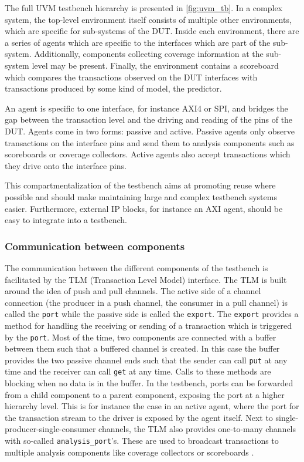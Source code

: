 \documentclass[11pt]{report}
\newcommand{\ttt}{\texttt}
\begin{document}
The full UVM testbench hierarchy is presented in \ref{fig:uvm_tb}. In a complex system, the top-level environment
itself consists of
multiple other environments, which are specific for sub-systems of the DUT. Inside each environment, there are a
series of agents which are specific to the interfaces which are part of the sub-system. Additionally, components
collecting coverage information at the sub-system level may be present. Finally, the environment contains a
scoreboard which compares the transactions observed on the DUT interfaces with transactions produced by some kind of
model, the predictor.

An agent is specific to one interface, for instance AXI4 or SPI, and bridges the gap between the transaction level
and the driving and reading of the pins of the DUT. Agents come in two forms: passive and active. Passive agents only
observe transactions on the interface pins and send them to analysis components such as scoreboards or coverage
collectors. Active agents also accept transactions which they drive onto the interface pins.

This compartmentalization of the testbench aims at promoting reuse where possible and should make maintaining large
and complex testbench systems easier. Furthermore, external IP blocks, for instance an AXI agent, should be easy to
integrate into a testbench.

\subsubsection{Communication between components} %

The communication between the different components of the testbench is facilitated by the TLM (Transaction Level
Model) interface. The TLM is built around the idea of push and pull channels. The active side of a channel connection
(the producer in a push channel, the consumer in a pull channel) is called the \ttt{port} while the passive side is
called the \ttt{export}. The \ttt{export} provides a method for handling the receiving or sending of a transaction
which is triggered by the \ttt{port}. Most of the time, two components are connected with a buffer between them such
that a buffered channel is created. In this case the buffer provides the two passive channel ends such that the
sender can call \ttt{put} at any time and the receiver can call \ttt{get} at any time. Calls to these methods are
blocking when no data is in the buffer. In the testbench, ports can be forwarded from a child component to a parent
component, exposing the port at a higher hierarchy level. This is for instance the case in an active agent, where the
port for the transaction stream to the driver is exposed by the agent itself. Next to single-producer-single-consumer
channels, the TLM also provides one-to-many channels with so-called \ttt{analysis\_port}'s. These are used to
broadcast transactions to multiple analysis components like coverage collectors or scoreboards \cite[ch. 4.5]{mehta2018asic}.
\end{document}
